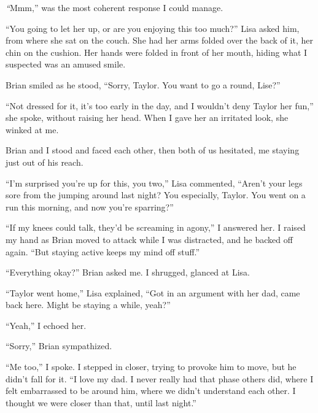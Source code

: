 \emph{``}Mmm,'' was the most coherent response I could manage.



``You going to let her up, or are you enjoying this too much?'' Lisa asked him, from where she sat on the couch.  She had her arms folded over the back of it, her chin on the cushion.  Her hands were folded in front of her mouth, hiding what I suspected was an amused smile.



Brian smiled as he stood, ``Sorry, Taylor.  You want to go a round, Lise?''



``Not dressed for it, it's too early in the day, and I wouldn't deny Taylor her fun,'' she spoke, without raising her head.  When I gave her an irritated look, she winked at me.



Brian and I stood and faced each other, then both of us hesitated, me staying just out of his reach.



``I'm surprised you're up for this, you two,'' Lisa commented, ``Aren't your legs sore from the jumping around last night?  You especially, Taylor.  You went on a run this morning, and now you're sparring?''



``If my knees could talk, they'd be screaming in agony,'' I answered her.  I raised my hand as Brian moved to attack while I was distracted, and he backed off again.  ``But staying active keeps my mind off stuff.''



``Everything okay?'' Brian asked me.  I shrugged, glanced at Lisa.



``Taylor went home,'' Lisa explained, ``Got in an argument with her dad, came back here.  Might be staying a while, yeah?''



``Yeah,'' I echoed her.



``Sorry,'' Brian sympathized.



``Me too,'' I spoke.  I stepped in closer, trying to provoke him to move, but he didn't fall for it.  ``I love my dad.  I never really had that phase others did, where I felt embarrassed to be around him, where we didn't understand each other.  I thought we were closer than that, until last night.''



